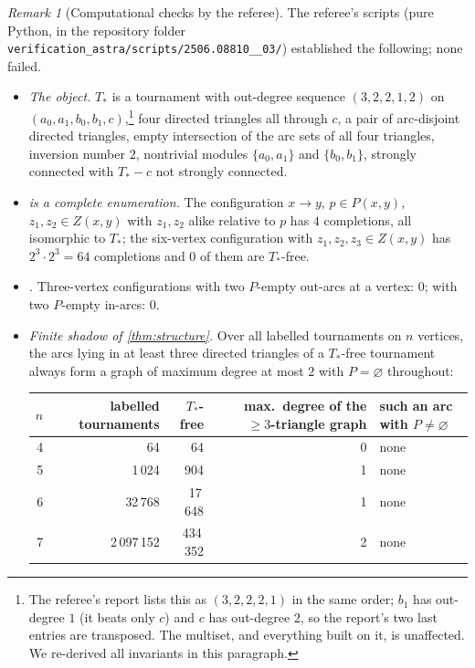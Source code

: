 \documentclass[11pt,a4paper]{article}
\theoremstyle{plain}
\theoremstyle{definition}
\theoremstyle{remark}
\newtheorem{remark}[theorem]{Remark}
\providecommand{\tightlist}{\setlength{\itemsep}{0pt}\setlength{\parskip}{0pt}}
\newcommand{\Tstar}{T_{\ast}}
\begin{document}
\begin{remark}[Computational checks by the referee]\label{rem:comp}
The referee's scripts (pure Python, in the repository folder \nolinkurl{verification_astra/scripts/2506.08810__03/}) established the following; none failed.
\begin{itemize}\tightlist
\item \emph{The object.} $\Tstar$ is a tournament with out-degree sequence $(3,2,2,1,2)$ on $(a_0,a_1,b_0,b_1,c)$,\footnote{The referee's report lists this as $(3,2,2,2,1)$ in the same order; $b_1$ has out-degree $1$ (it beats only $c$) and $c$ has out-degree $2$, so the report's two last entries are transposed. The multiset, and everything built on it, is unaffected. We re-derived all invariants in this paragraph.} four directed triangles all through $c$, a pair of arc-disjoint directed triangles, empty intersection of the arc sets of all four triangles, inversion number $2$, nontrivial modules $\{a_0,a_1\}$ and $\{b_0,b_1\}$, strongly connected with $\Tstar-c$ not strongly connected.
\item \emph{ is a complete enumeration.} The configuration $x\to y$, $p\in P(x,y)$, $z_1,z_2\in Z(x,y)$ with $z_1,z_2$ alike relative to $p$ has $4$ completions, all isomorphic to $\Tstar$; the six-vertex configuration with $z_1,z_2,z_3\in Z(x,y)$ has $2^3\cdot 2^3=64$ completions and $0$ of them are $\Tstar$-free.
\item \emph{.} Three-vertex configurations with two $P$-empty out-arcs at a vertex: $0$; with two $P$-empty in-arcs: $0$.
\item \emph{Finite shadow of \cref{thm:structure}.} Over all labelled tournaments on $n$ vertices, the arcs lying in at least three directed triangles of a $\Tstar$-free tournament always form a graph of maximum degree at most $2$ with $P=\varnothing$ throughout:
\begin{center}\small
\begin{tabular}{@{}rrrrl@{}}\toprule
$n$ & labelled tournaments & $\Tstar$-free & max.\ degree of the $\ge3$-triangle graph & such an arc with $P\ne\varnothing$\\\midrule
4 & 64 & 64 & 0 & none\\
5 & 1\,024 & 904 & 1 & none\\
6 & 32\,768 & 17\,648 & 1 & none\\
7 & 2\,097\,152 & 434\,352 & 2 & none\\\bottomrule
\end{tabular}
\end{center}

\end{itemize}
\end{remark}
\end{document}
